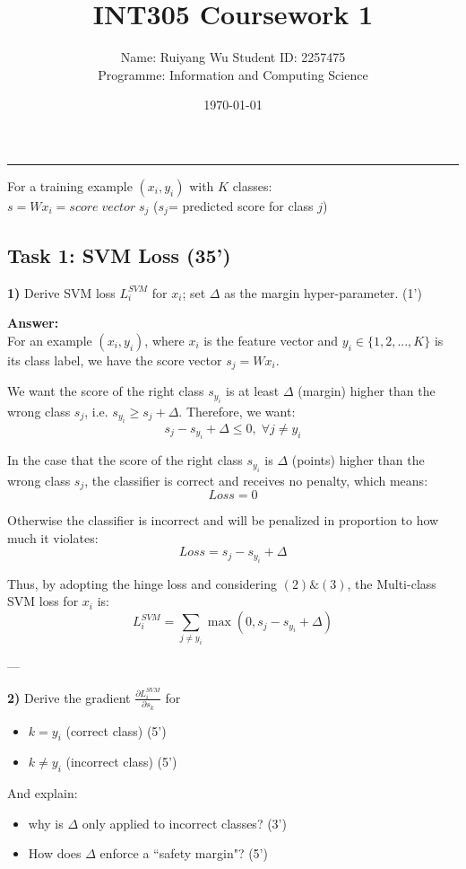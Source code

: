 \documentclass[12pt,a4paper]{article}
\title{\textbf{INT305 Coursework 1}}
\author{Name: Ruiyang Wu \quad Student ID: 2257475 \\ Programme: Information and Computing Science}
\date{\today}
\begin{document}
	
	\maketitle
	\vspace{-1em}
	\noindent\rule{\textwidth}{0.4pt}
	
	For a training example $(x_i,y_i)$ with $K$ classes:\\
	$s=Wx_i=score\;vector\;s_j$ ($s_j$= predicted score for class $j$) 
	
	\subsection*{Task 1: SVM Loss (35’)}

	\textbf{1)}  
	Derive SVM loss $L_i^{SVM}$ for $x_i$; set $\Delta$ as the margin hyper-parameter. (1’) 
	
	\textbf{Answer:}\\
	For an example $(x_i,y_i)$, where $x_i$ is the feature vector and $y_i \in \{1,2,...,K\}$ is its class label, we have the score vector $s_j=Wx_i$. 
	
	We want the score of the right class $s_{y_i}$ is at least $\Delta$ (margin) higher than the wrong class $s_j$, i.e. $s_{y_i}\ge s_j + \Delta$. Therefore, we want:
	\begin{equation}
		s_j-s_{y_i} + \Delta \le 0,\; \forall j\ne y_i
	\end{equation}

	In the case that the score of the right class $s_{y_i}$ is $\Delta$ (points) higher than the wrong class $s_j$, the classifier is correct and receives no penalty, which means: 
	\begin{equation}
	Loss = 0
	\end{equation}

	Otherwise the classifier is incorrect and will be penalized in proportion to how much it violates:
	\begin{equation}
		Loss = s_j-s_{y_i} + \Delta
	\end{equation}

	Thus, by adopting the hinge loss and considering $(2) \& (3)$, the Multi-class SVM loss for $x_i$ is:
	\begin{equation}
	L_i^{SVM} = \sum_{j\ne y_i} \max (0, s_j - s_{y_i} + \Delta)
	\end{equation}

	---
	
	\textbf{2)}  
	Derive the gradient $\frac{\partial L_i^{SVM}}{\partial s_k}$ for
	\begin{itemize}[itemsep=0pt, topsep=0pt, parsep=0pt, partopsep=0pt]
		\item $k = y_i$ (correct class) (5’)
		\item $k \ne y_i$ (incorrect class) (5’)
	\end{itemize}
	And explain:
	\begin{itemize}[itemsep=0pt, topsep=0pt, parsep=0pt, partopsep=0pt]
		\item why is $\Delta$ only applied to incorrect classes? (3’)
		\item How does $\Delta$ enforce a ``safety margin"? (5’)
	\end{itemize}
	
\end{document}
